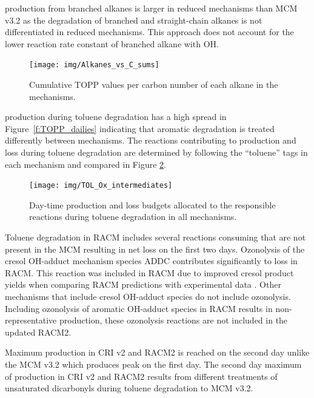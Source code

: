  production from branched alkanes is larger in reduced mechanisms than MCM v3.2 as the degradation of branched and straight-chain alkanes is not differentiated in reduced mechanisms.
This approach does not account for the lower reaction rate constant of branched alkane with OH.

\begin{figure}
    \centering
    \texttt{[image: img/Alkanes\_vs\_C\_sums]}
    \vspace{0mm}
    \caption{Cumulative TOPP values per carbon number of each alkane in the mechanisms.}
    \vspace{-4mm}
    \label{f:alkane_C}
\end{figure}

 production during toluene degradation has a high spread in \mbox{Figure \ref{f:TOPP_dailies}} indicating that aromatic degradation is treated differently between mechanisms.
The reactions contributing to  production and loss during toluene degradation are determined by following the ``toluene'' tags in each mechanism and compared in Figure \ref{f:toluene_Ox}.

\begin{figure}
    \centering
    \texttt{[image: img/TOL\_Ox\_intermediates]}
    \vspace{0mm}
    \caption{Day-time  production and loss budgets allocated to the responsible reactions during toluene degradation in all mechanisms.}
    \vspace{-4mm}
    \label{f:toluene_Ox}
\end{figure}

Toluene degradation in RACM includes several reactions consuming  that are not present in the MCM resulting in net  loss on the first two days.
Ozonolysis of the cresol OH-adduct mechanism species ADDC contributes significantly to  loss in RACM.
This reaction was included in RACM due to improved cresol product yields when comparing RACM predictions with experimental data \citep{Stockwell:1997}. 
Other mechanisms that include cresol OH-adduct species do not include ozonolysis.
Including ozonolysis of aromatic OH-adduct species in RACM results in non-representative  production, these ozonolysis reactions are not included in the updated RACM2.

Maximum  production in CRI v2 and RACM2 is reached on the second day unlike the MCM v3.2 which produces peak  on the first day.
The second day maximum of  production in CRI v2 and RACM2 results from different treatments of unsaturated dicarbonyls during toluene degradation to MCM v3.2.

